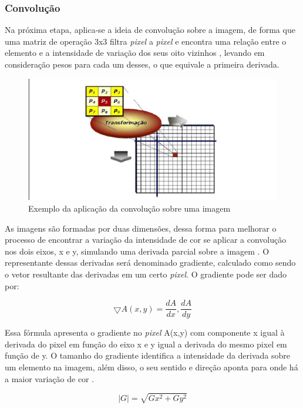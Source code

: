 \documentclass[12pt]{article}
\begin{document}
	\subsubsection{Convolução}
	Na próxima etapa, aplica-se a ideia de convolução sobre a imagem, de forma que uma matriz de operação 3x3 filtra \textit{pixel} a \textit{pixel} e encontra uma relação entre o elemento e a intensidade de variação dos seus oito vizinhos \cite{do2002processo}, levando em consideração pesos para cada um desses, o que equivale a primeira derivada.
	
	\begin{figure}[h!]
		\centering
		\includegraphics[width=0.7\linewidth]{img/img91}
		\caption{Exemplo da aplicação da convolução sobre uma imagem \citep{morgan2008tecnicas}}
		\label{fig:img91}
	\end{figure}
	
	As imagens são formadas por duas dimensões, dessa forma para melhorar o processo de encontrar a variação da intensidade de cor se aplicar a convolução nos dois eixos, x e y, simulando uma derivada parcial sobre a imagem \cite{biasi2002desenvolvimento}. O representante dessas derivadas será denominado gradiente, calculado como sendo o vetor resultante das derivadas em um certo \textit{pixel}. O gradiente pode ser dado por:
	
	\begin{equation}
	\bigtriangledown A(x,y)=\frac{dA}{dx},\frac{dA}{dy}
	\end{equation}
	
	Essa fórmula apresenta o gradiente no \textit{pixel} A(x,y) com componente x igual à derivada do pixel em função do eixo x e y igual a derivada do mesmo pixel em função de y. O tamanho do gradiente identifica a intensidade da derivada sobre um elemento na imagem, além disso, o seu sentido e direção aponta para onde há a maior variação de cor \cite{de2006introduccao}.
	
	\begin{equation}
	\mid G \mid= \sqrt{Gx^2+Gy^2}
	\end{equation}
	
\end{document}
